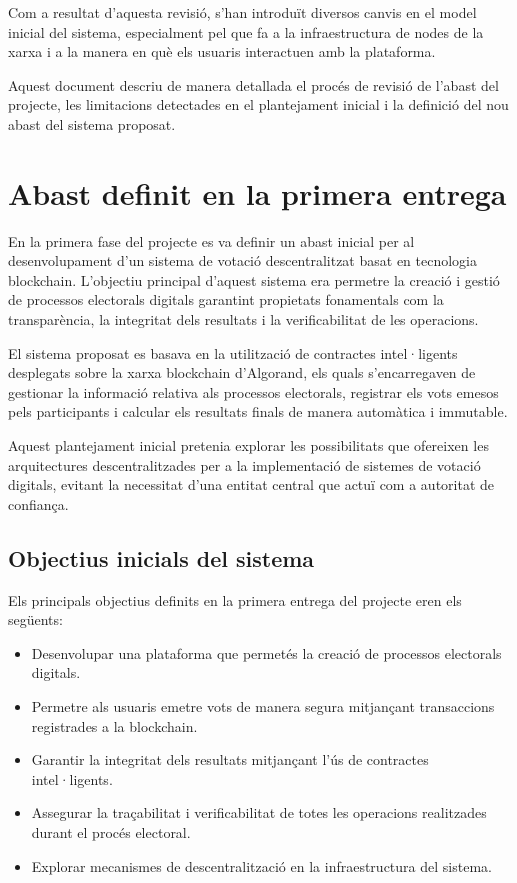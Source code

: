 \documentclass[12pt,a4paper]{article}
\begin{document}
Com a resultat d'aquesta revisió, s'han introduït diversos canvis en el model inicial del sistema, especialment pel que fa a la infraestructura de nodes de la xarxa i a la manera en què els usuaris interactuen amb la plataforma.

Aquest document descriu de manera detallada el procés de revisió de l'abast del projecte, les limitacions detectades en el plantejament inicial i la definició del nou abast del sistema proposat.


\section{Abast definit en la primera entrega}

En la primera fase del projecte es va definir un abast inicial per al desenvolupament d'un sistema de votació descentralitzat basat en tecnologia blockchain. L'objectiu principal d'aquest sistema era permetre la creació i gestió de processos electorals digitals garantint propietats fonamentals com la transparència, la integritat dels resultats i la verificabilitat de les operacions.

El sistema proposat es basava en la utilització de contractes intel·ligents desplegats sobre la xarxa blockchain d'Algorand, els quals s'encarregaven de gestionar la informació relativa als processos electorals, registrar els vots emesos pels participants i calcular els resultats finals de manera automàtica i immutable.

Aquest plantejament inicial pretenia explorar les possibilitats que ofereixen les arquitectures descentralitzades per a la implementació de sistemes de votació digitals, evitant la necessitat d'una entitat central que actuï com a autoritat de confiança.

\subsection{Objectius inicials del sistema}

Els principals objectius definits en la primera entrega del projecte eren els següents:

\begin{itemize}
\item Desenvolupar una plataforma que permetés la creació de processos electorals digitals.
\item Permetre als usuaris emetre vots de manera segura mitjançant transaccions registrades a la blockchain.
\item Garantir la integritat dels resultats mitjançant l'ús de contractes intel·ligents.
\item Assegurar la traçabilitat i verificabilitat de totes les operacions realitzades durant el procés electoral.
\item Explorar mecanismes de descentralització en la infraestructura del sistema.
\end{itemize}
\end{document}
